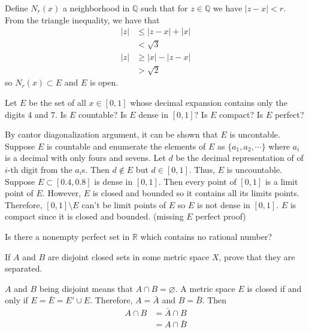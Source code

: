 \begin{exercise}
  Define \(N_r(x)\) a neighborhood in \(\mathbb{Q}\) such that for \(z\in\mathbb{Q}\) we have
  \(\lvert z - x\rvert < r\).
  From the triangle inequality, we have that
  \[
  	\begin{aligned}
		\lvert z\rvert &\leq \lvert z - x\rvert + \lvert x\rvert\\
		&< \sqrt{3}\\
		\lvert z\rvert &\geq \lvert x\rvert - \lvert z - x\rvert\\
		&> \sqrt{2}
	\end{aligned}
  \]
  so \(N_r(x)\subset E\) and \(E\) is open.
\item
  Let \(E\) be the set of all \(x\in[0,1]\) whose decimal expansion contains
  only the digits \(4\) and \(7\).
  Is \(E\) countable?
  Is \(E\) dense in \([0, 1]\)?
  Is \(E\) compact?
  Is \(E\) perfect?
  \par\smallskip
  By cantor diagonalization argument, it can be shown that \(E\) is uncontable.
  Suppose \(E\) is countable and enumerate the elements of \(E\) as
  \(\{a_1,a_2,\cdots\}\) where \(a_i\) is a decimal with only fours and sevens.
  Let \(d\) be the decimal representation of of \(i\)-th digit from the
  \(a_i\)s.
  Then \(d\not\in E\) but \(d\in[0,1]\).
  Thus, \(E\) is uncountable.
  Suppose \(E\subset [0.4,0.8]\) is dense in \([0,1]\).
  Then every point of \([0,1]\) is a limit point of \(E\).
  However, \(E\) is closed and bounded so it contains all its limits points.
  Therefore, \([0,1]\setminus E\) can't be limit points of \(E\) so \(E\)
  is not dense in \([0,1]\).
  \(E\) is compact since it is closed and bounded.
  (missing \(E\) perfect proof)
\item
  Is there a nonempty perfect set in \(\mathbb{R}\) which contains no rational
  number?
\item
  \begin{exercise}[label = (\alph*), ref = \arabic{exercisei} (\alph*)]
  \item
    If \(A\) and \(B\) are disjoint closed sets in some metric space \(X\),
    prove that they are separated.
    \par\smallskip
    \(A\) and \(B\) being disjoint means that \(A\cap B = \varnothing\).
    A metric space \(E\) is closed if and only if \(E = \bar{E} = E'\cup E\).
    Therefore, \(A = \bar{A}\) and \(B = \bar{B}\).
    Then
    \begin{align*}
      A\cap B & = \bar{A}\cap B\\
              & = A\cap\bar{B}\\

\end{align*}
\end{exercise}
\end{exercise}

